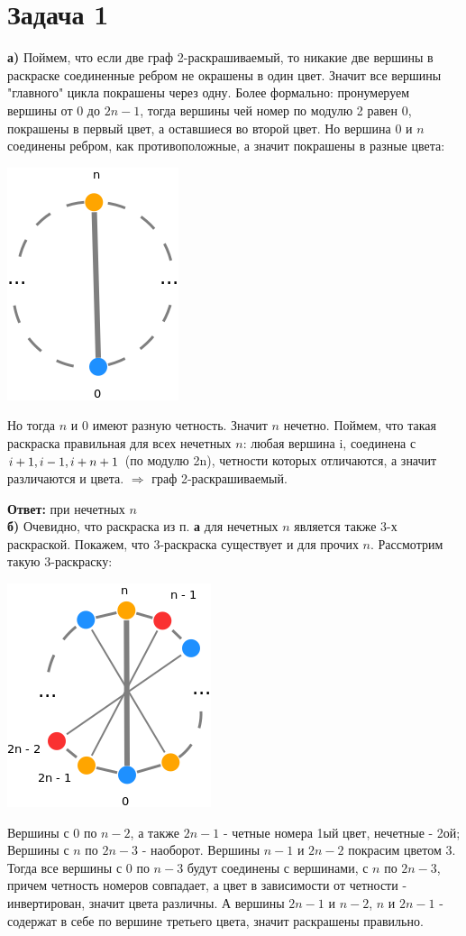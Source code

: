 \documentclass{article}
\begin{document}
\section{Задача 1}
	\textbf{а)} Поймем, что если две граф 2-раскрашиваемый, то никакие две вершины в раскраске соединенные ребром не окрашены в один цвет. Значит все вершины "главного" цикла покрашены через одну. Более формально: пронумеруем вершины от 0 до $ 2n - 1$, тогда вершины чей номер по модулю 2 равен 0, покрашены в первый цвет, а оставшиеся во второй цвет.
	Но вершина 0 и $n$ соединены ребром, как противоположные, а значит покрашены в разные цвета:
	\begin{center}
		\includegraphics[scale=0.5]{1_1}
	\end{center}
	
	Но тогда $n$ и 0 имеют разную четность. Значит $n$ нечетно. Поймем, что такая раскраска правильная для всех нечетных $n$: любая вершина i, соединена с $ i + 1,\space i - 1,\space i + n + 1$ (по модулю 2n), четности которых отличаются, а значит различаются и цвета. $\Rightarrow$ граф 2-раскрашиваемый.
	
	\textbf{Ответ:} при нечетных $n$
	\\
	\textbf{б)} Очевидно, что раскраска из п. \textbf{а} для нечетных $n$ является также 3-х раскраской.
	Покажем, что 3-раскраска существует и для прочих $n$. Рассмотрим такую 3-раскраску:
	\begin{center}
	\includegraphics[scale=0.5]{1_2}
	\end{center}
	Вершины с 0 по $n - 2$, а также $2n - 1$ - четные номера 1ый цвет, нечетные - 2ой; Вершины с $n$ по $2n - 3$ - наоборот. Вершины $n - 1$ и $2n - 2$ покрасим цветом 3.
	Тогда все вершины с 0 по $n - 3$ будут соединены с вершинами, с $n$ по $2n - 3$, причем четность номеров совпадает, а цвет в зависимости от четности - инвертирован, значит цвета различны. А вершины $2n - 1$ и $n - 2$, $n$ и $2n - 1$ - содержат в себе по вершине третьего цвета, значит раскрашены правильно.
	
\end{document}
